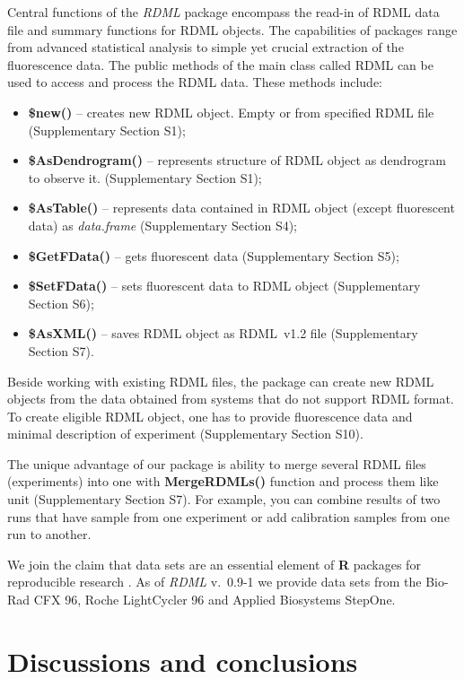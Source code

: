 \documentclass{bioinfo}
\begin{document}
	Central functions of the \textit{RDML} package encompass the read-in of RDML
	data file and summary functions for RDML objects. The capabilities of packages range 
	from advanced statistical analysis to simple yet crucial extraction of the fluorescence 
	data. The public methods of the main class called RDML can be used to access and process 
	the RDML data. These methods include: \begin{itemize} \item
		\textbf{\$new()} -- creates new RDML object. Empty or from specified RDML file
		(Supplementary Section S1); \item \textbf{\$AsDendrogram()} -- represents
		structure of RDML object as dendrogram to observe it. (Supplementary Section
		S1); \item \textbf{\$AsTable()} -- represents data contained in RDML object
		(except fluorescent data) as \textit{data.frame} (Supplementary Section S4);
		\item \textbf{\$GetFData()} -- gets fluorescent data (Supplementary Section S5);
		\item \textbf{\$SetFData()} -- sets fluorescent data to RDML object
		(Supplementary Section S6); \item \textbf{\$AsXML()} -- saves RDML object as
		RDML~v1.2 file (Supplementary Section S7). \end{itemize}
	
	Beside working with existing RDML files, the package can create new RDML objects from
	the data obtained from systems that do not support RDML format. To create eligible RDML 
	object, one has to provide fluorescence data and minimal description of experiment
	(Supplementary Section S10).
	
	The unique advantage of our package is ability to merge several RDML files
	(experiments) into one with \textbf{MergeRDMLs()} function and process them like
	unit (Supplementary Section S7). For example, you can combine results of two
	runs that have sample from one experiment or add calibration samples from one
	run to another.
	
	We join the claim that data sets are an essential element of \textbf{R} packages 
	for reproducible research \cite{gentleman_2004,hofmann_2013,Leeper_2014}. 
	As of \textit{RDML} v.~0.9-1 we provide data sets from the Bio-Rad CFX 96, Roche 
	LightCycler 96 and Applied Biosystems StepOne.
	
	\section{Discussions and conclusions}
	
\end{document}
